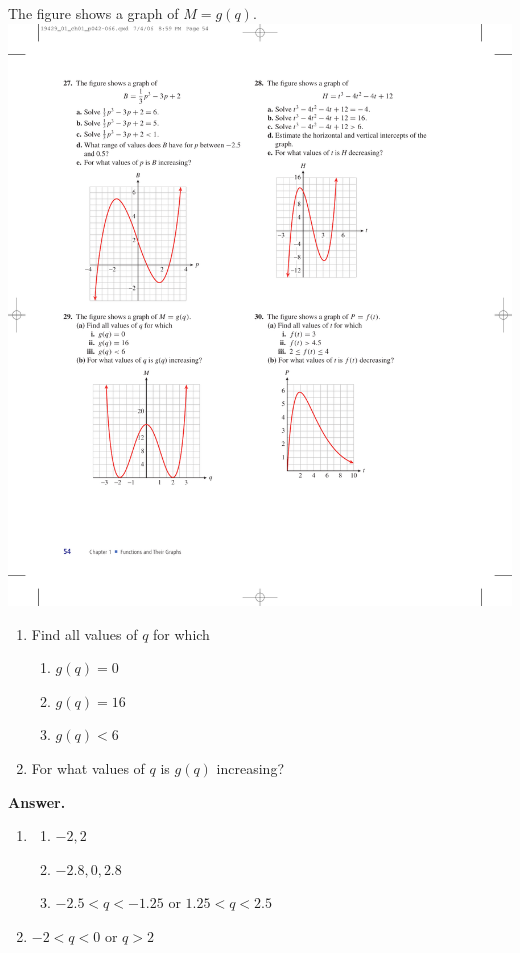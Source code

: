 \documentclass[10pt,]{book}
\theoremstyle{plain}
\theoremstyle{definition}
\theoremstyle{definition}
\theoremstyle{definition}
\theoremstyle{definition}
\numberwithin{equation}{part}
\newcommand{\lt}{<}
\newcommand{\gt}{>}
\begin{document}
\begin{exerciselist}
\begin{exercisegroup}
\exercise[29.]\hypertarget{exercise-186}{}The figure shows a graph of \(M = g(q)\). \includegraphics[width=0.5\linewidth]{images/fig-ex-1-3-29}
 \leavevmode%
\begin{enumerate}[label=*\alph**]
\item\hypertarget{li-800}{}Find all values of \(q\) for which %
\begin{enumerate}[label=*\roman**]
\item\hypertarget{li-801}{}\(g(q) = 0\)%
\item\hypertarget{li-802}{}\(g(q) = 16\)%
\item\hypertarget{li-803}{}\(g(q)\lt 6\)%
\end{enumerate}
%
\item\hypertarget{li-804}{}For what values of \(q\) is \(g(q)\) increasing?%
\end{enumerate}
%
\par\smallskip
\noindent\textbf{Answer.}\hypertarget{answer-107}{}\quad
\leavevmode%
\begin{enumerate}[label=*\alph**]
\item\hypertarget{li-805}{}%
\begin{enumerate}[label=*\roman**]
\item\hypertarget{li-806}{}\(-2, 2\)%
\item\hypertarget{li-807}{}\(-2.8, 0, 2.8\)%
\item\hypertarget{li-808}{}\(-2.5\lt q\lt-1.25\) or \(1.25\lt q\lt 2.5\)%
\end{enumerate}
%
\item\hypertarget{li-809}{}\(-2 \lt q\lt 0\)  or \(q\gt 2\)%
\end{enumerate}
%

\end{exercisegroup}
\end{exerciselist}
\end{document}
